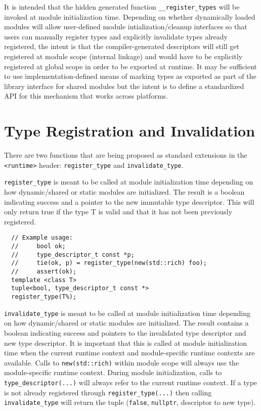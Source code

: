 \documentclass[10pt,a4paper]{article}
\begin{document}
It is intended that the hidden generated function \verb+__register_types+ will
be invoked at module initialization time. Depending on whether dynamically
loaded modules will allow user-defined module intialization/cleanup interfaces
so that users can manually register types and explicitly invalidate types
already registered, the intent is that the compiler-generated descriptors will
still get registered at module scope (internal linkage) and would have to be
explicitly registered at global scope in order to be exported at runtime. It may
be sufficient to use implementation-defined means of marking types as exported
as part of the library interface for shared modules but the intent is to define
a standardized API for this mechanism that works across platforms.

\section{Type Registration and Invalidation}
\label{appendix:type-registration-invalidation}

There are two functions that are being proposed as standard extensions in the
\verb+<runtime>+ header: \verb+register_type+ and \verb+invalidate_type+.

\verb+register_type+ is meant to be called at module initialization time
depending on how dynamic/shared or static modules are initialized.  The result
is a boolean indicating success and a pointer to the new immutable type
descriptor. This will only return true if the type T is valid and that it has
not been previously registered.

\begin{verbatim}
  // Example usage:
  //     bool ok;
  //     type_descriptor_t const *p;
  //     tie(ok, p) = register_type(new(std::rich) foo);
  //     assert(ok);
  template <class T>
  tuple<bool, type_descriptor_t const *>
  register_type(T%);
\end{verbatim}

\verb+invalidate_type+ is meant to be called at module initialization time
depending on how dynamic/shared or static modules are initialized.
The result contains a boolean indicating success and pointers to the
invalidated type descriptor and new type descriptor. It is important
that this is called at module initialization time when the current
runtime context and module-specific runtime contexts are available.
Calls to \verb+new(std::rich)+ within module scope will always use the
module-specific runtime context. During module initialization, calls
to \verb+type_descriptor(...)+ will always refer to the current runtime
context. If a type is not already registered through
\verb+register_type(...)+ then calling \verb+invalidate_type+ will return the tuple
(\verb+false+, \verb+nullptr+, descriptor to new type).
\end{document}
